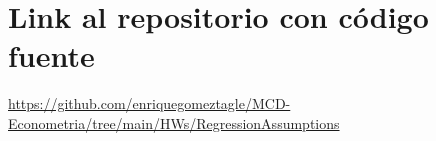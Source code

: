 \documentclass[10pt]{article}
\begin{document}
\section{Link al repositorio con código fuente}
\url{https://github.com/enriquegomeztagle/MCD-Econometria/tree/main/HWs/RegressionAssumptions}
\end{document}
